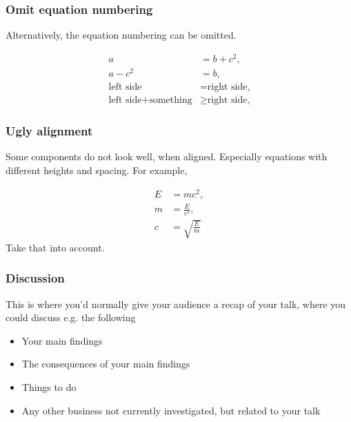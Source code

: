 \documentclass[aspectratio=169]{beamer}
\begin{document}
\begin{frame}
  \frametitle{Omit equation numbering}
Alternatively, the equation numbering can be omitted.

\begin{align*}
a &= b + c^2, \\
a - c^2 &= b, \\
\text{left side} &= \text{right side,} \\
\text{left side} + \text{something} &\geq \text{right side,}
\end{align*}

 \end{frame}

\begin{frame}
  \frametitle{Ugly alignment}
Some components do not look well, when aligned. Especially equations with different heights and spacing. For example,

\begin{align}
E &= mc^2, \\
m &= \frac{E}{c^2}, \\
c &= \sqrt{\frac{E}{m}} 
\end{align}
Take that into account.

 \end{frame}

\begin{frame}
  \frametitle{Discussion}
This is where you’d normally give your audience a recap of your talk, where you could discuss e.g. the following

\begin{itemize}
\item Your main findings
\item The consequences of your main findings
\item Things to do 
\item Any other business not currently investigated, but related to your talk
\end{itemize}

 \end{frame}
\end{document}
